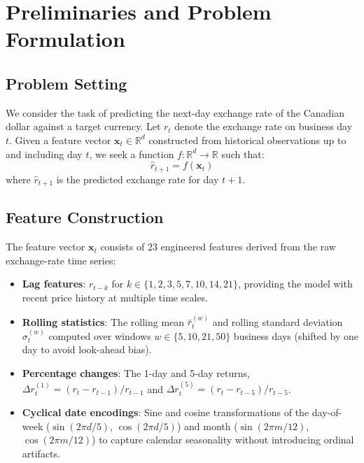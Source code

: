 \documentclass{article}
\begin{document}
\section{Preliminaries and Problem Formulation}

\subsection{Problem Setting}

We consider the task of predicting the next-day exchange rate of the Canadian dollar against a target currency. Let $r_t$ denote the exchange rate on business day $t$. Given a feature vector $\mathbf{x}_t \in \mathbb{R}^d$ constructed from historical observations up to and including day $t$, we seek a function $f: \mathbb{R}^d \rightarrow \mathbb{R}$ such that:
\begin{equation}
  \hat{r}_{t+1} = f(\mathbf{x}_t)
\end{equation}
where $\hat{r}_{t+1}$ is the predicted exchange rate for day $t+1$.

\subsection{Feature Construction}

The feature vector $\mathbf{x}_t$ consists of 23 engineered features derived from the raw exchange-rate time series:

\begin{itemize}
  \item \textbf{Lag features}: $r_{t-k}$ for $k \in \{1, 2, 3, 5, 7, 10, 14, 21\}$, providing the model with recent price history at multiple time scales.
  \item \textbf{Rolling statistics}: The rolling mean $\bar{r}_{t}^{(w)}$ and rolling standard deviation $\sigma_{t}^{(w)}$ computed over windows $w \in \{5, 10, 21, 50\}$ business days (shifted by one day to avoid look-ahead bias).
  \item \textbf{Percentage changes}: The 1-day and 5-day returns, $\Delta r_t^{(1)} = (r_t - r_{t-1})/r_{t-1}$ and $\Delta r_t^{(5)} = (r_t - r_{t-5})/r_{t-5}$.
  \item \textbf{Cyclical date encodings}: Sine and cosine transformations of the day-of-week ($\sin(2\pi d/5)$, $\cos(2\pi d/5)$) and month ($\sin(2\pi m/12)$, $\cos(2\pi m/12)$) to capture calendar seasonality without introducing ordinal artifacts.
\end{itemize}
\end{document}
